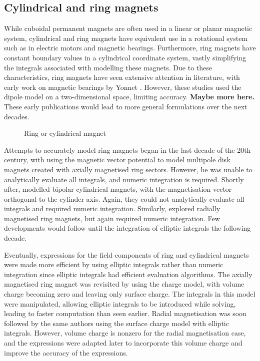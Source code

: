 \subsection{Cylindrical and ring magnets}
While cuboidal permanent magnets are often used in a linear or planar magnetic system, cylindrical and ring magnets have equivalent use in a rotational system such as in electric motors and magnetic bearings. Furthermore, ring magnets have constant boundary values in a cylindrical coordinate system, vastly simplifying the integrals associated with modelling these magnets. Due to these characteristics, ring magnets have seen extensive attention in literature, with early work on magnetic bearings by Yonnet \cite{Yonnet1978,Yonnet1981}. However, these studies used the dipole model on a two-dimensional space, limiting accuracy. \textbf{Maybe more here.} These early publications would lead to more general formulations over the next decades.
\begin{figure}
    \centering
    \vspace{5cm}
    \caption{Ring or cylindrical magnet}
    \label{fig:ringMagnet}
\end{figure}

Attempts to accurately model ring magnets began in the last decade of the 20th century, with \textcite{Furlani1994} using the magnetic vector potential to model multipole disk magnets created with axially magnetised ring sectors. However, he was unable to analytically evaluate all integrals, and numeric integration is required. Shortly after, \textcite{Furlani1994a} modelled bipolar cylindrical magnets, with the magnetisation vector orthogonal to the cylinder axis. Again, they could not analytically evaluate all integrals and required numeric integration. Similarly, \textcite{Furlani1995} explored radially magnetised ring magnets, but again required numeric integration. Few developments would follow until the integration of elliptic integrals the following decade.

Eventually, expressions for the field components of ring and cylindrical magnets were made more efficient by using elliptic integrals rather than numeric integration since elliptic integrals had efficient evaluation algorithms. The axially magnetised ring magnet was revisited by \textcite{Ravaud2008} using the charge model, with volume charge becoming zero and leaving only surface charge. The integrals in this model were manipulated, allowing elliptic integrals to be introduced while solving, leading to faster computation than seen earlier. Radial magnetisation was soon followed by the same authors \cite{Ravaud2008a} using the surface charge model with elliptic integrals. However, volume charge is nonzero for the radial magnetisation case, and the expressions were adapted later \cite{Ravaud2009a} to incorporate this volume charge and improve the accuracy of the expressions.

